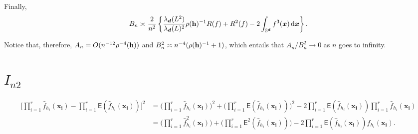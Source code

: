 \documentclass{article}
\begin{document}
Finally,
\begin{align*}
    B_n \asymp \frac{2}{n^2} \left\{\frac{\lambda_{\boldsymbol{d}}(L^2)}{\lambda_{\boldsymbol{d}}(L)^2} \rho(\mathbf h)^{-1} R(f) + R^2(f) -2 \int_{\mathbb{S}^{\boldsymbol{d}}}f^3(\boldsymbol{x}) \,\mathrm{d} \boldsymbol{x}\right\}.
\end{align*}

Notice that, therefore, $A_n = O(n^{-12} \rho^{-4}(\mathbf h))$ and $B_n^2 \asymp n^{-4}(\rho(\mathbf h)^{-1}+1)$, which entails that $A_n / B_n^2 \to 0$ as $n$ goes to infinity.

\section{$I_{n2}$}

\begin{align}
    \Big[ \prod_{i = 1}^{r} \hat{f}_{h_i}(\mathbf{x_i}) - \prod_{i = 1}^{r} \mathsf{E} (\hat{f}_{h_i} (\mathbf{x_i})) \Big]^2 &= \Bigg( \prod_{i = 1}^{r} \hat{f}_{h_i}(\mathbf{x_i}) \Bigg)^2 + \Bigg( \prod_{i = 1}^{r} \mathsf{E} (\hat{f}_{h_i} (\mathbf{x_i})) \Bigg)^2 - 2 \prod_{i = 1}^{r} \mathsf{E} (\hat{f}_{h_i} (\mathbf{x_i})) \prod_{i = 1}^{r} \hat{f}_{h_i}(\mathbf{x_i}) \\
    &= \Bigg( \prod_{i = 1}^{r} \hat{f}_{h_i}^2(\mathbf{x_i}) \Bigg) + \Bigg( \prod_{i = 1}^{r} \mathsf{E}^2 (\hat{f}_{h_i} (\mathbf{x_i})) \Bigg) - 2 \prod_{i = 1}^{r} \mathsf{E} (\hat{f}_{h_i} (\mathbf{x_i})) \hat{f}_{h_i}(\mathbf{x_i}).
\end{align}
\end{document}
